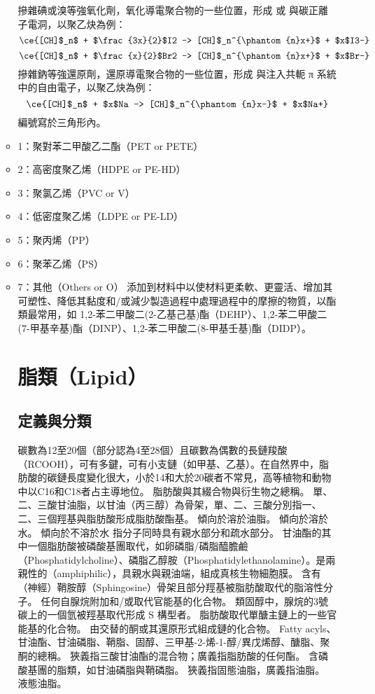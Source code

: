 \documentclass[a4paper,12pt]{report}
\begin{document}
\begin{itemize}
\begin{itemize}
摻雜碘或溴等強氧化劑，氧化導電聚合物的一些位置，形成  或  與碳正離子電洞，以聚乙炔為例：
\[\ce{[CH]$_n$ + $\frac{3x}{2}$I2 -> [CH]$_n^{\phantom{n}x+}$ + $x$I3-}\]
\[\ce{[CH]$_n$ + $\frac{x}{2}$Br2 -> [CH]$_n^{\phantom{n}x+}$ + $x$Br-}\]
摻雜鈉等強還原劑，還原導電聚合物的一些位置，形成  與注入共軛 π 系統中的自由電子，以聚乙炔為例：
\[\ce{[CH]$_n$ + $x$Na -> [CH]$_n^{\phantom{n}x-}$ + $x$Na+}\]
編號寫於三角形內。
\bit
\item 1：聚對苯二甲酸乙二酯（PET or PETE）
\item 2：高密度聚乙烯（HDPE or PE-HD）
\item 3：聚氯乙烯（PVC or V）
\item 4：低密度聚乙烯（LDPE or PE-LD）
\item 5：聚丙烯（PP）
\item 6：聚苯乙烯（PS）
\item 7：其他（Others or O）
\eit
{}
添加到材料中以使材料更柔軟、更靈活、增加其可塑性、降低其黏度和/或減少製造過程中處理過程中的摩擦的物質，以酯類最常用，如 1,2-苯二甲酸二(2-乙基己基)酯（DEHP）、1,2-苯二甲酸二(7-甲基辛基)酯（DINP）、1,2-苯二甲酸二(8-甲基壬基)酯（DIDP）。


\section{脂類（Lipid）}
\subsection{定義與分類}
碳數為12至20個（部分認為4至28個）且碳數為偶數的長鏈羧酸（RCOOH），可有多鍵，可有小支鏈（如甲基、乙基）。在自然界中，脂肪酸的碳鏈長度變化很大，小於14和大於20碳者不常見，高等植物和動物中以C16和C18者占主導地位。
脂肪酸與其綴合物與衍生物之總稱。
單、二、三酸甘油脂，以甘油（丙三醇）為骨架，單、二、三酸分別指一、二、三個羥基與脂肪酸形成脂肪酸酯基。
傾向於溶於油脂。
傾向於溶於水。
傾向於不溶於水
指分子同時具有親水部分和疏水部分。
甘油酯的其中一個脂肪酸被磷酸基團取代，如卵磷脂/磷脂醯膽鹼（Phosphatidylcholine）、磷脂乙醇胺（Phosphatidylethanolamine）。是兩親性的（amphiphilic），具親水與親油端，組成真核生物細胞膜。
含有（神經）鞘胺醇（Sphingosine）骨架且部分羥基被脂肪酸取代的脂溶性分子。
任何自腺烷附加和/或取代官能基的化合物。
類固醇中，腺烷的3號碳上的一個氫被羥基取代形成 S 構型者。
脂肪酸取代單醣主鏈上的一些官能基的化合物。
由交替的酮或其還原形式組成鏈的化合物。
Fatty acyls、甘油酯、甘油磷脂、鞘脂、固醇、三甲基-2-烯-1-醇/異戊烯醇、醣脂、聚酮的總稱。
狹義指三酸甘油酯的混合物；廣義指脂肪酸的任何酯。
含磷酸基團的脂類，如甘油磷脂與鞘磷脂。
狹義指固態油脂，廣義指油脂。
液態油脂。

\end{itemize}
\end{itemize}
\end{document}
